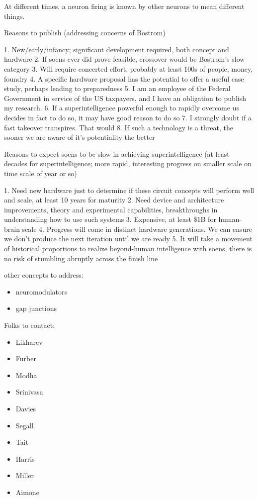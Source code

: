 \documentclass[twocolumn]{article}
\begin{document}
\vspace{2em}
At different times, a neuron firing is known by other neurons to mean different things.

\vspace{3em}
Reasons to publish (addressing concerns of Bostrom)

1. New/early/infancy; significant development required, both concept and hardware
2. If soens ever did prove feasible, crossover would be Bostrom's slow category
3. Will require concerted effort, probably at least 100s of people, money, foundry
4. A specific hardware proposal has the potential to offer a useful case study, perhaps leading to preparedness
5. I am an employee of the Federal Government in service of the US taxpayers, and I have an obligation to publish my research.
6. If a superintelligence powerful enough to rapidly overcome us decides in fact to do so, it may have good reason to do so
7. I strongly doubt if a fast takeover transpires. That would
8. If such a technology is a threat, the sooner we are aware of it's potentiality the better

Reasons to expect soens to be slow in achieving superintelligence (at least decades for superintelligence; more rapid, interesting progress on smaller scale on time scale of year or so)

1. Need new hardware just to determine if these circuit concepts will perform well and scale, at least 10 years for maturity
2. Need device and architecture improvements, theory and experimental capabilities, breakthroughs in understanding how to use such systems
3. Expensive, at least \$1B for human-brain scale
4. Progress will come in distinct hardware generations. We can ensure we don't produce the next iteration until we are ready
5. It will take a movement of historical proportions to realize beyond-human intelligence with soens, there is no risk of stumbling abruptly across the finish line

\vspace{3em}
other concepts to address:
\begin{itemize}
\item neuromodulators
\item gap junctions
\end{itemize}

\vspace{3em}
Folks to contact:
\begin{itemize} 
\item Likharev
\item Furber
\item Modha
\item Srinivasa
\item Davies
\item Segall
\item Tait
\item Harris
\item Miller
\item Aimone
\end{itemize}
	
\end{document}

